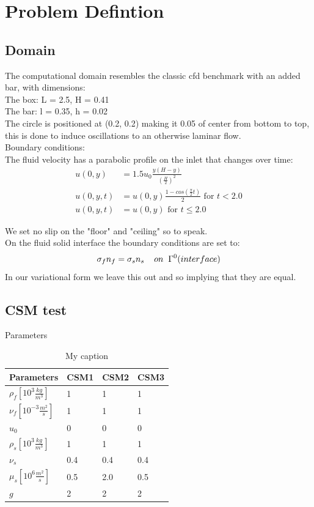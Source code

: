 


\newpage
\section*{Problem Defintion}
\subsection*{Domain}
The computational domain resembles the classic cfd benchmark with an added bar, with dimensions: \\
The box: L = 2.5, H = 0.41 \\
The bar: l = 0.35, h = 0.02 \\
The circle is positioned at (0.2, 0.2) making it 0.05 of center from bottom to top, this is done to induce oscillations to an otherwise laminar flow.\\
Boundary conditions:\\
The fluid velocity has a parabolic profile on the inlet that changes over time:\\

\begin{align*}
u(0,y) &= 1.5u_0 \frac{y(H-y)}{(\frac{H}{2})^2}  \\
u(0,y,t) &= u(0,y)\frac{1-cos(\frac{\pi}{2}t)}{2} \text{  for  } t<2.0 \\
u(0,y,t) &= u(0,y) \text{  for  } t \leq 2.0
\end{align*}

We set no slip on the "floor" and "ceiling" so to speak.\\
On the fluid solid interface the boundary conditions are set to:
$$  \sigma_f n_f = \sigma_s n_s \hspace{4mm} on  \hspace{2mm}\Gamma^0 (interface)   $$
In our variational form we leave this out and so implying that they are equal.

\subsection*{CSM test}
Parameters
\begin{table}[h]
\centering
\caption{My caption}
\label{my-label}
\begin{tabular}{|l|l|l|l|}
\hline
Parameters & CSM1 & CSM2 & CSM3 \\ \hline
$\rho_f[10^3 \frac{kg}{m^3}]$ & 1 & 1 & 1 \\ \hline
$\nu_f [10^{-3} \frac{m^2}{s}]$ & 1 & 1 & 1 \\ \hline
$u_0$ & 0 & 0 & 0 \\ \hline
$\rho_s[10^3 \frac{kg}{m^3}]$ & 1 & 1 & 1 \\ \hline
$\nu_s$ & 0.4 & 0.4 & 0.4 \\ \hline
$\mu_s[10^6 \frac{m^2}{s}]$ & 0.5 & 2.0 & 0.5 \\ \hline
$g $ & 2 & 2 & 2 \\ \hline
\end{tabular}
\end{table}

